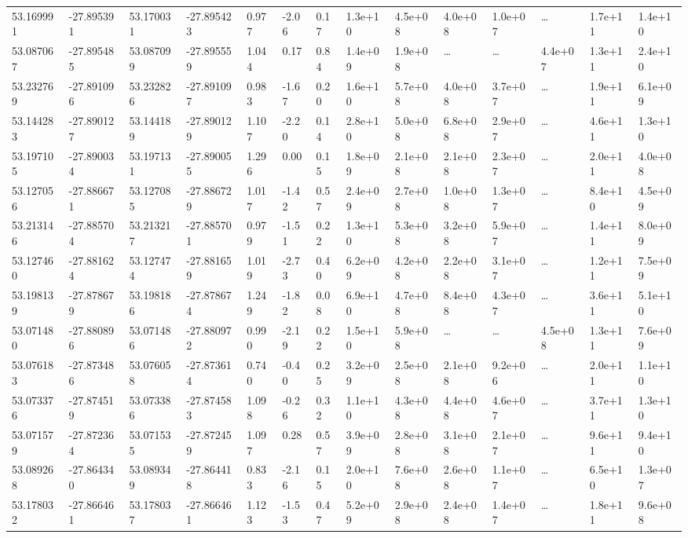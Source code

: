 \documentclass[referee]{aa}
\begin{document}
{\begin{landscape}
\begin{longtable}{llllllllllllll}
53.169991 & -27.895391 & 53.170031 & -27.895423 & 0.977 & -2.06 & 0.17 & 1.3e+10 & 4.5e+08 & 4.0e+08 & 1.0e+07 & \ldots & 1.7e+11 & 1.4e+10  \\
53.087067 & -27.895485 & 53.087099 & -27.895559 & 1.044 & 0.17 & 0.84 & 1.4e+09 & 1.9e+08 & \ldots & \ldots & 4.4e+07 & 1.3e+11 & 2.4e+10  \\
53.232769 & -27.891096 & 53.232826 & -27.891097 & 0.983 & -1.67 & 0.20 & 1.6e+10 & 5.7e+08 & 4.0e+08 & 3.7e+07 & \ldots & 1.9e+11 & 6.1e+09  \\
53.144283 & -27.890127 & 53.144189 & -27.890129 & 1.107 & -2.20 & 0.14 & 2.8e+10 & 5.0e+08 & 6.8e+08 & 2.9e+07 & \ldots & 4.6e+11 & 1.3e+10  \\
53.197105 & -27.890034 & 53.197131 & -27.890055 & 1.296 & 0.00 & 0.15 & 1.8e+09 & 2.1e+08 & 2.1e+08 & 2.3e+07 & \ldots & 2.0e+11 & 4.0e+08  \\
53.127056 & -27.886671 & 53.127085 & -27.886729 & 1.017 & -1.42 & 0.57 & 2.4e+09 & 2.7e+08 & 1.0e+08 & 1.3e+07 & \ldots & 8.4e+10 & 4.5e+09  \\
53.213146 & -27.885704 & 53.213217 & -27.885701 & 0.979 & -1.51 & 0.22 & 1.3e+10 & 5.3e+08 & 3.2e+08 & 5.9e+07 & \ldots & 1.4e+11 & 8.0e+09  \\
53.127460 & -27.881624 & 53.127474 & -27.881659 & 1.019 & -2.73 & 0.40 & 6.2e+09 & 4.2e+08 & 2.2e+08 & 3.1e+07 & \ldots & 1.2e+11 & 7.5e+09  \\
53.198139 & -27.878679 & 53.198186 & -27.878674 & 1.249 & -1.82 & 0.08 & 6.9e+10 & 4.7e+08 & 8.4e+08 & 4.3e+07 & \ldots & 3.6e+11 & 5.1e+10  \\
53.071480 & -27.880896 & 53.071486 & -27.880972 & 0.990 & -2.19 & 0.22 & 1.5e+10 & 5.9e+08 & \ldots & \ldots & 4.5e+08 & 1.3e+11 & 7.6e+09  \\
53.076183 & -27.873486 & 53.076058 & -27.873614 & 0.740 & -0.40 & 0.25 & 3.2e+09 & 2.5e+08 & 2.1e+08 & 9.2e+06 & \ldots & 2.0e+11 & 1.1e+10  \\
53.073376 & -27.874519 & 53.073386 & -27.874583 & 1.098 & -0.26 & 0.32 & 1.1e+10 & 4.3e+08 & 4.4e+08 & 4.6e+07 & \ldots & 3.7e+11 & 1.3e+10  \\
53.071579 & -27.872364 & 53.071535 & -27.872459 & 1.097 & 0.28 & 0.57 & 3.9e+09 & 2.8e+08 & 3.1e+08 & 2.1e+07 & \ldots & 9.6e+11 & 9.4e+10  \\
53.089268 & -27.864340 & 53.089349 & -27.864418 & 0.833 & -2.16 & 0.15 & 2.0e+10 & 7.6e+08 & 2.6e+08 & 1.1e+07 & \ldots & 6.5e+10 & 1.3e+07  \\
53.178032 & -27.866461 & 53.178037 & -27.866461 & 1.123 & -1.53 & 0.47 & 5.2e+09 & 2.9e+08 & 2.4e+08 & 1.4e+07 & \ldots & 1.8e+11 & 9.6e+08  \\

\end{longtable}
\end{landscape}}
\end{document}
